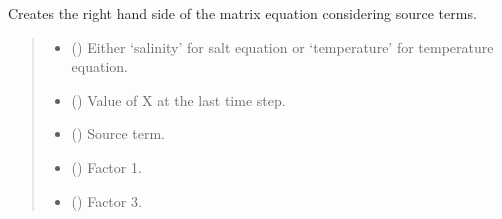 \documentclass[a4paper,11pt,english,openany]{sphinxmanual}
\begin{document}
\begin{fulllineitems}
\label{\detokenize{api/spyice.rhs:spyice.rhs.apply_boundary_condition}}
\pysigstartsignatures
{}
\pysigstopsignatures
\sphinxAtStartPar
Creates the right hand side of the matrix equation considering source terms.
\begin{quote}\begin{description}
\begin{itemize}
\item {} 
\sphinxAtStartPar
{} () \textendash{} Either ‘salinity’ for salt equation or ‘temperature’ for temperature equation.

\item {} 
\sphinxAtStartPar
{} () \textendash{} Value of X at the last time step.

\item {} 
\sphinxAtStartPar
{} () \textendash{} Source term.

\item {} 
\sphinxAtStartPar
{} () \textendash{} Factor 1.

\item {} 
\sphinxAtStartPar
{} () \textendash{} Factor 3.


\end{itemize}
\end{description}
\end{quote}
\end{fulllineitems}
\end{document}
